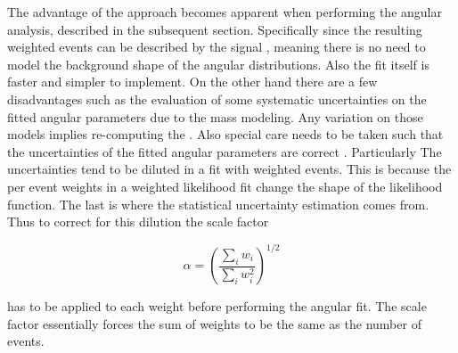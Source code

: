 The advantage of the \sWeights approach becomes apparent when performing the angular analysis, described in the subsequent section. Specifically since the resulting 
\BsJpsiKst weighted events can be described by the signal \pdf, meaning there is no need to model the background shape of the angular distributions.
Also the fit itself is faster and simpler to implement. On the other hand there are a few 
disadvantages such as the evaluation of some systematic uncertainties on the fitted angular parameters due to the mass \pdf modeling.
Any variation on those models implies re-computing the \sWeights. Also special care needs to be taken such that the uncertainties
of the fitted angular parameters are correct \cite{splot}. Particularly The uncertainties tend to be diluted in a fit with weighted
events. This is because the per event weights in a weighted likelihood fit change the shape of the likelihood function. The last is 
where the statistical uncertainty estimation comes from. Thus to correct for this dilution the scale factor 

\begin{equation}
\alpha = \left(\frac{\sum_{i} w_i}{\sum_{i} w_i^2}\right)^{1/2}
\label{sWeights_scale_factor}
\end{equation}

\noindent has to be applied to each weight before performing the angular fit. The scale factor essentially forces the sum of weights
to be the same as the number of events.

